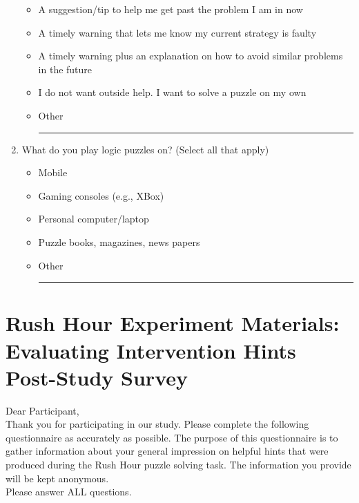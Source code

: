 \documentclass[doctor]{thesis} %
\theoremstyle{plain}
\begin{document}
\begin{enumerate}[topsep=-4em]
\begin{itemize}[topsep=-6em, label={o}]
\itemsep-1em 
\item A suggestion/tip to help me get past the problem I am in now
\item A timely warning that lets me know my current strategy is faulty
\item A timely warning plus an explanation on how to avoid similar problems in the future
\item I do not want outside help. I want to solve a puzzle on my own
\item Other \rule{4cm}{0.4pt}
\end{itemize}
\item  What do you play logic puzzles on? (Select all that apply)
\begin{itemize}[topsep=-6em, label={o}]
\itemsep-1em 
\item Mobile
\item Gaming consoles (e.g., XBox)
\item Personal computer/laptop
\item Puzzle books, magazines, news papers
\item Other \rule{4cm}{0.4pt}
\end{itemize}
\end{enumerate}


\chapter{Rush Hour Experiment Materials: Evaluating Intervention Hints Post-Study Survey}
\label{apx:rushpost}
Dear Participant,\\
Thank you for participating in our study. Please complete the following questionnaire as accurately as possible. The purpose of this questionnaire is to gather information about your general impression on helpful hints that were produced during the Rush Hour puzzle solving task. The information you provide will be kept anonymous. \\
Please answer ALL questions.
\end{document}
